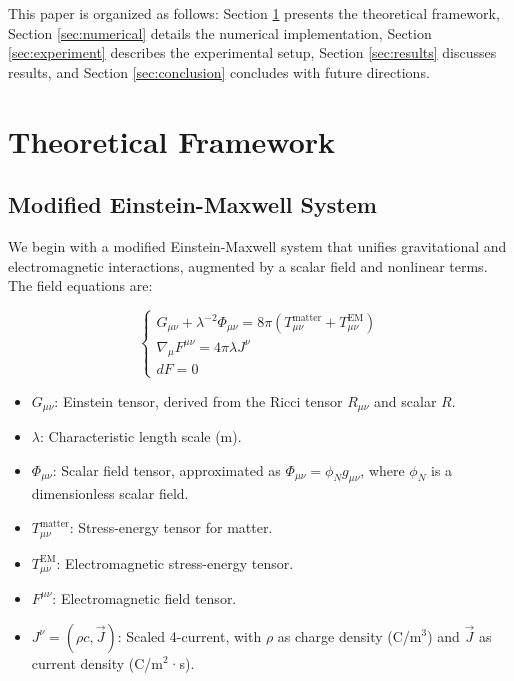 \documentclass[12pt]{article}
\begin{document}
This paper is organized as follows: Section \ref{sec:theory} presents the theoretical framework, Section \ref{sec:numerical} details the numerical implementation, Section \ref{sec:experiment} describes the experimental setup, Section \ref{sec:results} discusses results, and Section \ref{sec:conclusion} concludes with future directions.

\section{Theoretical Framework}
\label{sec:theory}

\subsection{Modified Einstein-Maxwell System}

We begin with a modified Einstein-Maxwell system that unifies gravitational and electromagnetic interactions, augmented by a scalar field and nonlinear terms. The field equations are:

\begin{equation}
\begin{cases}
G_{\mu \nu} + \lambda^{-2} \Phi_{\mu \nu} = 8\pi \left( T_{\mu \nu}^{\text{matter}} + T_{\mu \nu}^{\text{EM}} \right) \\
\nabla_{\mu} F^{\mu \nu} = 4\pi \lambda J^{\nu} \\
dF = 0
\end{cases}
\label{eq:field_equations}
\end{equation}

\begin{itemize}
    \item \( G_{\mu \nu} \): Einstein tensor, derived from the Ricci tensor \( R_{\mu \nu} \) and scalar \( R \).
    \item \( \lambda \): Characteristic length scale (m).
    \item \( \Phi_{\mu \nu} \): Scalar field tensor, approximated as \( \Phi_{\mu \nu} = \phi_N g_{\mu \nu} \), where \( \phi_N \) is a dimensionless scalar field.
    \item \( T_{\mu \nu}^{\text{matter}} \): Stress-energy tensor for matter.
    \item \( T_{\mu \nu}^{\text{EM}} \): Electromagnetic stress-energy tensor.
    \item \( F^{\mu \nu} \): Electromagnetic field tensor.
    \item \( J^{\nu} = (\rho c, \vec{J}) \): Scaled 4-current, with \( \rho \) as charge density (C/m\(^3\)) and \( \vec{J} \) as current density (C/m\(^2\)·s).
\end{itemize}
\end{document}
